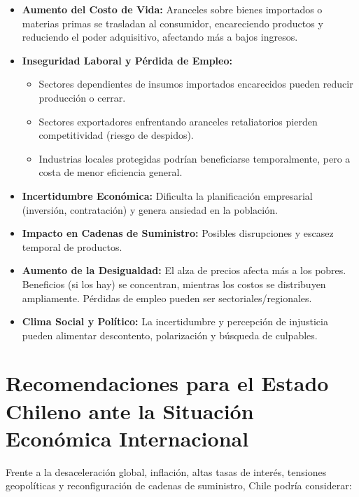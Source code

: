 \documentclass[12pt, a4paper]{article}
\begin{document}
\begin{itemize}
    \item \textbf{Aumento del Costo de Vida:} Aranceles sobre bienes importados o materias primas se trasladan al consumidor, encareciendo productos y reduciendo el poder adquisitivo, afectando más a bajos ingresos.
    \item \textbf{Inseguridad Laboral y Pérdida de Empleo:}
        \begin{itemize}
            \item Sectores dependientes de insumos importados encarecidos pueden reducir producción o cerrar.
            \item Sectores exportadores enfrentando aranceles retaliatorios pierden competitividad (riesgo de despidos).
            \item Industrias locales protegidas podrían beneficiarse temporalmente, pero a costa de menor eficiencia general.
        \end{itemize}
    \item \textbf{Incertidumbre Económica:} Dificulta la planificación empresarial (inversión, contratación) y genera ansiedad en la población.
    \item \textbf{Impacto en Cadenas de Suministro:} Posibles disrupciones y escasez temporal de productos.
    \item \textbf{Aumento de la Desigualdad:} El alza de precios afecta más a los pobres. Beneficios (si los hay) se concentran, mientras los costos se distribuyen ampliamente. Pérdidas de empleo pueden ser sectoriales/regionales.
    \item \textbf{Clima Social y Político:} La incertidumbre y percepción de injusticia pueden alimentar descontento, polarización y búsqueda de culpables.
\end{itemize}

\section{Recomendaciones para el Estado Chileno ante la Situación Económica Internacional}

Frente a la desaceleración global, inflación, altas tasas de interés, tensiones geopolíticas y reconfiguración de cadenas de suministro, Chile podría considerar:
\end{document}
